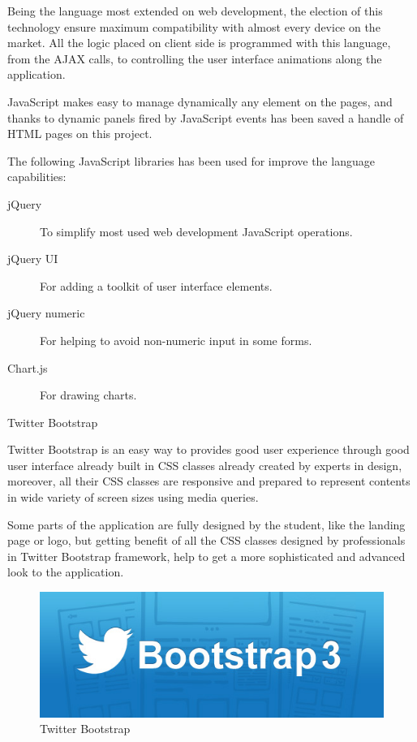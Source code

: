 \documentclass{DeustoFDP}
\begin{document}
Being the language most extended on web development, the election of this technology ensure maximum compatibility with almost every device on the market. All the logic placed on client side is programmed with this language, from the AJAX calls, to controlling the user interface animations along the application.

JavaScript makes easy to manage dynamically any element on the pages, and thanks to dynamic panels fired by JavaScript events has been saved a handle of HTML pages on this project.

The following JavaScript libraries has been used for improve the language capabilities:
\begin{description}
	\item[jQuery] To simplify most used web development JavaScript operations.
	\item[jQuery UI] For adding a toolkit of user interface elements.
	\item[jQuery numeric] For helping to avoid non-numeric input in some forms.
	\item[Chart.js] For drawing charts.
\end{description}

{\large Twitter Bootstrap}

Twitter Bootstrap \cite{Twitterbootstrap} is an easy way to provides good user experience through good user interface already built in CSS classes already created by experts in design, moreover, all their CSS classes are responsive and prepared to represent contents in wide variety of screen sizes using media queries.

Some parts of the application are fully designed by the student, like the landing page or logo, but getting benefit of all the CSS classes designed by professionals in Twitter Bootstrap framework, help to get a more sophisticated and advanced look to the application.

\begin{figure}[h]
\centering
\includegraphics[width=0.7\linewidth]{fig/bootstrap-3}
\caption[Twitter Bootstrap]{Twitter Bootstrap}
\label{fig:bootstrap-3}
\end{figure}
\end{document}
